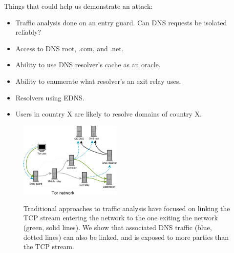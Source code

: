 Things that could help us demonstrate an attack:
\begin{itemize}
	\item Traffic analysis done on an entry guard.  Can DNS requests be isolated
		reliably?
	\item Access to DNS root, .com, and .net.
	\item Ability to use DNS resolver's cache as an oracle.
	\item Ability to enumerate what resolver's an exit relay uses.
	\item Resolvers using EDNS.
	\item Users in country X are likely to resolve domains of country X.
\end{itemize}

\begin{figure}[t]
	\centering
	\includegraphics[width=0.45\textwidth]{figures/overview.pdf}
	\label{fig:overview}
	\caption{Traditional approaches to traffic analysis have focused on linking
	the TCP stream entering the network to the one exiting the network (green,
	solid lines).  We show that associated DNS traffic (blue, dotted lines) can
	also be linked, and is exposed to more parties than the TCP stream.}
\end{figure}
